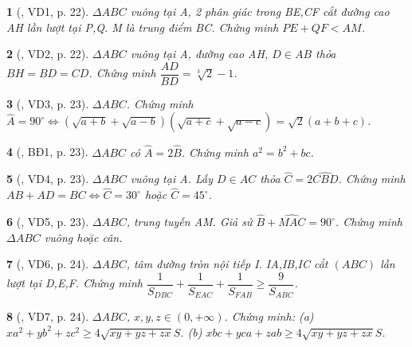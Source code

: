 \documentclass{article}
\newtheorem{baitoan}{}
\begin{document}
\begin{baitoan}[\cite{Hai_Hung_Thu_Tung2022_tap_1}, VD1, p. 22]
	$\Delta ABC$ vuông tại A, 2 phân giác trong BE,CF cắt đường cao AH lần lượt tại P,Q. M là trung điểm BC. Chứng minh $PE + QF < AM$.
\end{baitoan}

\begin{baitoan}[\cite{Hai_Hung_Thu_Tung2022_tap_1}, VD2, p. 22]
	$\Delta ABC$ vuông tại A, đường cao AH, $D\in AB$ thỏa $BH = BD = CD$. Chứng minh $\dfrac{AD}{BD} = \sqrt[3]{2} - 1$.
\end{baitoan}

\begin{baitoan}[\cite{Hai_Hung_Thu_Tung2022_tap_1}, VD3, p. 23]
	$\Delta ABC$. Chứng minh $\widehat{A} = 90^\circ\Leftrightarrow(\sqrt{a + b} + \sqrt{a - b})(\sqrt{a + c} + \sqrt{a - c}) = \sqrt{2}(a + b + c)$.
\end{baitoan}

\begin{baitoan}[\cite{Hai_Hung_Thu_Tung2022_tap_1}, BĐ1, p. 23]
	$\Delta ABC$ có $\widehat{A} = 2\widehat{B}$. Chứng minh $a^2 = b^2 + bc$.
\end{baitoan}

\begin{baitoan}[\cite{Hai_Hung_Thu_Tung2022_tap_1}, VD4, p. 23]
	$\Delta ABC$ vuông tại A. Lấy $D\in AC$ thỏa $\widehat{C} = 2\widehat{CBD}$. Chứng minh $AB + AD = BC\Leftrightarrow\widehat{C} = 30^\circ$ hoặc $\widehat{C} = 45^\circ$.
\end{baitoan}

\begin{baitoan}[\cite{Hai_Hung_Thu_Tung2022_tap_1}, VD5, p. 23]
	$\Delta ABC$, trung tuyến AM. Giả sử $\widehat{B} + \widehat{MAC} = 90^\circ$. Chứng minh $\Delta ABC$ vuông hoặc cân.
\end{baitoan}

\begin{baitoan}[\cite{Hai_Hung_Thu_Tung2022_tap_1}, VD6, p. 24]
	$\Delta ABC$, tâm đường tròn nội tiếp I. IA,IB,IC cắt $(ABC)$ lần lượt tại D,E,F. Chứng minh $\dfrac{1}{S_{DBC}} + \dfrac{1}{S_{EAC}} + \dfrac{1}{S_{FAB}}\ge\dfrac{9}{S_{ABC}}$.
\end{baitoan}

\begin{baitoan}[\cite{Hai_Hung_Thu_Tung2022_tap_1}, VD7, p. 24]
	$\Delta ABC$, $x,y,z\in(0,+\infty)$. Chứng minh: (a) $xa^2 + yb^2 + zc^2\ge4\sqrt{xy + yz + zx}S$. (b) $xbc + yca + zab\ge4\sqrt{xy + yz + zx}S$.
\end{baitoan}
\end{document}
